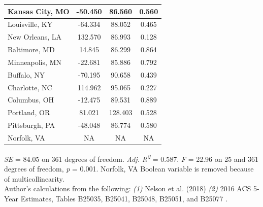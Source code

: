 \documentclass[paper=letter, fontsize=12pt]{scrartcl} %
\begin{document}
\begin{table}
\begin{center}
\begin{tabular}{|| l | c c c ||}
				\hline
				Kansas City, MO & -50.450 & 86.560 & 0.560 \\
				\hline
				Louisville, KY & -64.334 & 88.052 & 0.465 \\
				\hline
				New Orleans, LA & 132.570 & 86.993 & 0.128 \\
				\hline
				Baltimore, MD & 14.845 & 86.299 & 0.864 \\
				\hline
				Minneapolis, MN & -22.681 & 85.886 & 0.792 \\
				\hline
				Buffalo, NY & -70.195 & 90.658 & 0.439 \\
				\hline
				Charlotte, NC & 114.962 & 95.065 & 0.227 \\
				\hline
				Columbus, OH & -12.475 & 89.531 & 0.889 \\
				\hline
				Portland, OR & 81.021 & 128.403 & 0.528 \\
				\hline
				Pittsburgh, PA & -48.048 & 86.774 & 0.580 \\
				\hline
				Norfolk, VA & NA & NA & NA \\
				\hline
			\end{tabular}
		\end{center}
		\textit{SE} = 84.05 on 361 degrees of freedom. \textit{Adj. R\textsuperscript{2}} = 0.587. \textit{F} = 22.96 on 25 and 361 degrees of freedom, \textit{p} = 0.001. Norfolk, VA Boolean variable is removed because of multicollinearity.\\
		Author's calculations from the following: \textit{(1)} Nelson et al. (2018) \cite{richmond} \textit{(2)} 2016 ACS 5-Year Estimates, Tables B25035, B25041, B25048, B25051, and B25077 \cite{acs16}.
	\end{table}
	
\end{document}
